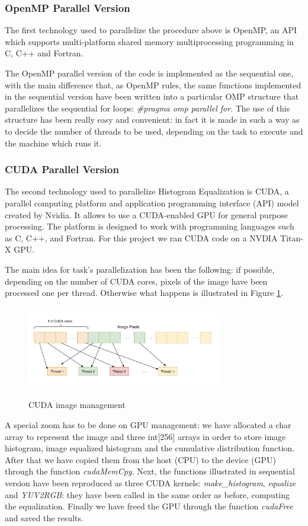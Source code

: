 \documentclass[10pt,twocolumn,letterpaper]{article}
\begin{document}
\subsubsection{OpenMP Parallel Version}
The first technology used to parallelize the procedure above is OpenMP, an API which supports multi-platform shared memory multiprocessing programming in C, C++ and Fortran. 

The OpenMP parallel version of the code is implemented as the sequential one, with the main difference that, as OpenMP rules, the same functions implemented in the sequential version have been written into a particular OMP structure that parallelizes the sequential for loops: \textit{\#pragma omp parallel for}. The use of this structure has been really easy and convenient: in fact it is made in such a way as to decide the number of threads to be used, depending on the task to execute and the machine which runs it.

\subsubsection{CUDA Parallel Version}
The second technology used to parallelize Histogram Equalization is CUDA, a parallel computing platform and application programming interface (API) model created by Nvidia. It allows to use a CUDA-enabled GPU for general purpose processing. The platform is designed to work with programming languages such as C, C++, and Fortran. For this project we ran CUDA code on a NVDIA Titan-X GPU.

The main idea for task's parallelization has been the following: if possible, depending on the number of CUDA cores, pixels of the image have been processed one per thread. Otherwise what happens is illustrated in Figure \ref{fig:shared}.

\begin{figure}[h]
	\centering
	\includegraphics[width=8.5cm, height=4cm]{shared}
	\caption{CUDA image management}
	\label{fig:shared}
\end{figure}

A special zoom has to be done on GPU management: we have allocated a char array to represent the image and three int[256] arrays in order to store image histogram, image equalized histogram and the cumulative distribution function. After that we have copied them from the host (CPU) to the device (GPU) through the function \textit{cudaMemCpy}. Next, the functions illustrated in sequential version have been reproduced as three CUDA kernels: \textit{make\_histogram}, \textit{equalize} and \textit{YUV2RGB}: they have been called in the same order as before, computing the equalization. Finally we have freed the GPU through the function \textit{cudaFree} and saved the results.
\end{document}
